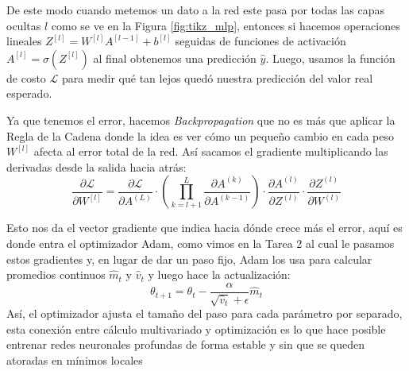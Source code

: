 De este modo cuando metemos un dato a la red este pasa por todas las capas ocultas $l$ como se ve en la Figura \ref{fig:tikz_mlp}, entonces si hacemos operaciones lineales $Z^{[l]} = W^{[l]}A^{[l-1]} + b^{[l]}$ seguidas de funciones de activación $A^{[l]} = \sigma(Z^{[l]})$ al final obtenemos una predicción $\hat{y}$. Luego, usamos la función de costo $\mathcal{L}$ para medir qué tan lejos quedó nuestra predicción del valor real esperado.


Ya que tenemos el error, hacemos \textit{Backpropagation} que no es más que aplicar la Regla de la Cadena donde la idea es ver cómo un pequeño cambio en cada peso $W^{[l]}$ afecta al error total de la red. Así sacamos el gradiente multiplicando las derivadas desde la salida hacia atrás:
\begin{equation}
    \frac{\partial \mathcal{L}}{\partial W^{[l]}} = \frac{\partial \mathcal{L}}{\partial A^{(L)}} \cdot \left( \prod_{k=l+1}^{L} \frac{\partial A^{(k)}}{\partial A^{(k-1)}} \right) \cdot \frac{\partial A^{(l)}}{\partial Z^{(l)}} \cdot \frac{\partial Z^{(l)}}{\partial W^{(l)}}
\end{equation}

Esto nos da el vector gradiente que indica hacia dónde crece más el error, aquí es donde entra el optimizador Adam, como vimos en la Tarea 2 al cual le pasamos estos gradientes y, en lugar de dar un paso fijo, Adam los usa para calcular promedios continuos $\hat{m}_t$ y $\hat{v}_t$ y luego hace la actualización:
\begin{equation}
    \theta_{t+1} = \theta_t - \frac{\alpha}{\sqrt{\hat{v}_t} + \epsilon} \hat{m}_t
\end{equation}
Así, el optimizador ajusta el tamaño del paso para cada parámetro por separado, esta conexión entre cálculo multivariado y optimización es lo que hace posible entrenar redes neuronales profundas de forma estable y sin que se queden atoradas en mínimos locales
